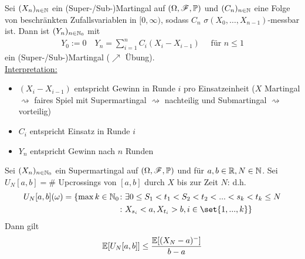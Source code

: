 \begin{example}
	Sei $(X_n)_{n\in \mathbb{N}}$ ein (Super-/Sub-)Martingal auf $(\Omega,\mathscr F,\mathbb{P})$ und $(C_n)_{n\in \mathbb{N}}$ eine Folge von beschränkten Zufallsvariablen in $[0,\infty)$, sodass $C_n$ $\sigma(X_0,\dots,X_{n-1})$-messbar ist. Dann ist $(Y_n)_{n\in \mathbb{N}_0}$ mit
	\begin{align*}
		Y_0 := 0 \quad Y_n = \sum_{i=1}^n C_i (X_i -X_{i-1}) \quad \text{ für }n \le 1
	\end{align*}
	ein (Super-/Sub-)Martingal ($\nearrow$ Übung).\\ %
	\ul{Interpretation:}\\
	\begin{itemize}
		\item $(X_i - X_{i-1})$ entspricht Gewinn in Runde $i$ pro Einsatzeinheit ($X$ Martingal $\rightsquigarrow$ faires Spiel mit Supermartingal $\rightsquigarrow$ nachteilig und Submartingal $\rightsquigarrow$ vorteilig)
		\item $C_i$ entspricht Einsatz in Runde $i$
		\item $Y_n$ entspricht Gewinn nach $n$ Runden
	\end{itemize}
\end{example}
\begin{lemma}
	Sei $(X_n)_{n\in \mathbb{N}_0}$ ein Supermartingal auf $(\Omega,\mathscr F,\mathbb{P})$ und für $a,b \in \mathbb{R},N\in \mathbb{N}$. Sei $U_N[a,b] = \#$ Upcrossings von $[a,b]$ durch $X$ bis zur Zeit $N$:
	d.h.
	\begin{align*}
		U_N[a,b](\omega) = \{\max k\in \N_0&\colon \exists 0 \le S_1 < t_1 < S_2 <t_2 < ... < s_k < t_k \le N \\
		&\colon X_{s_i} < a, X_{t_i}>b, i \in \set{1,...,k}\}
	\end{align*}
	Dann gilt
	\begin{align*}
		\mathbb{E}[U_N[a,b]] \le \frac{\mathbb{E}[(X_N - a)^-]}{b-a}
	\end{align*}
\end{lemma}
